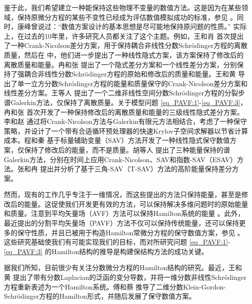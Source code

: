  鉴于此，我们希望建立一种能保持这些物理不变量的数值方法。这是因为在某些领域，保持原微分方程的某些不变性已经成为评估数值模拟成功的标准，参见 \cite{liFiniteDifferenceCalculus1995}。同时，康峰曾说过：“数值方案设计的基本思想是尽可能地保持原问题的性质。” 实际上，在过去的10年里，许多研究人员都关注了这个主题。例如，王和肖 \cite{wangCrankNicolsonDifference2013} 首次提出了一种Crank-Nicolson差分方案，用于保持耦合非线性分数Schr{\"o}dinger方程的离散质量，然后在 \cite{wangLinearlyImplicitConservative2014} 中，他们进一步提出了一种线性隐式方案，该方案保持了修改后的离散质量和能量。冉和张 \cite{ranConservativeDifferenceScheme2016} 提出了一个隐式差分方案和一个线性差分方案，分别保持了强耦合非线性分数Schr{\"o}dinger方程的原始和修改后的质量和能量。王和黄 \cite{wangEnergyConservativeDifference2015,wangConservativeLinearizedDifference2015} 导出了单一立方分数Schr{\"o}dinger方程的能量和质量保守的Crank-Nicolson差分方案和线性差分方案。王等人 \cite{wangSplitstepSpectralGalerkin2019} 提出了一个二维非线性空间分数Schr{\"o}dinger方程的分裂步谱Galerkin方法，仅保持了离散质量。关于模型问题 \eqref{eq_PAVF:1}-\eqref{eq_PAVF:3}，冉和张 \cite{ranLinearlyImplicitConservative2016} 首次开发了一种保持修改后的离散质量和能量的三级线性隐式差分方案。李和赵 \cite{liFastEnergyConserving2018} 通过将Crank-Nicolson方法与Galerkin有限元方法相结合，考虑了一种保守策略，并设计了一个带有合适循环预处理器的快速Krylov子空间求解器以节省计算成本。程和秦 \cite{chengConvergenceEnergyconservingScheme2022} 基于标量辅助变量（SAV）方法开发了一种线性隐式保守数值方案，仅保持了修改后的能量，而不是质量。胡等人 \cite{huEfficientEnergyPreserving2022} 提出了三种能量保持的谱Galerkin方法，分别在时间上应用Crank-Nicolson、SAV和指数-SAV（ESAV）方法。张和冉 \cite{zhangHighorderStructurepreservingDifference2023} 提出并分析了基于三角-SAV（T-SAV）方法的高阶能量保持差分方案。

然而，现有的工作几乎专注于一维情况，而这些提出的方法只保持能量，甚至是修改后的能量。这促使我们开发更有效的方法，可以保持解决多维问题时的原始能量和质量。注意到平均矢量场（AVF）方法可以保持Hamilton系统的能量 \cite{buddGeometricIntegrationUsing1999,quispelNewClassEnergypreserving2008}。此外，最近提出的分割平均矢量场（PAVF）方法不仅可以保持传统能量，还可以保持更多的保守性质，并且已被用于构造Hamilton常微分方程的保守数值方案，参见 \cite{caiPartitionedAveragedVector2018}。这些研究基础使我们有可能实现我们的目标，而对所研究问题 \eqref{eq_PAVF:1}-\eqref{eq_PAVF:3} 的Hamilton结构的推导是构建保结构方法的成功关键。

据我们所知，目前很少有关注分数微分方程的Hamilton结构的研究。最近，王和黄 \cite{wangStructurepreservingNumericalMethods2018} 提出了带有分数Laplacian的泛函的变分导数，并将一维分数非线性Schr{\"o}dinger方程重新表述为一个Hamilton系统。傅和蔡 \cite{fuStructurepreservingAlgorithmsTwodimensional2020} 推导了二维分数Klein-Gordon-Schr{\"o}dinger方程的Hamilton形式，并随后发展了保守数值方案。

